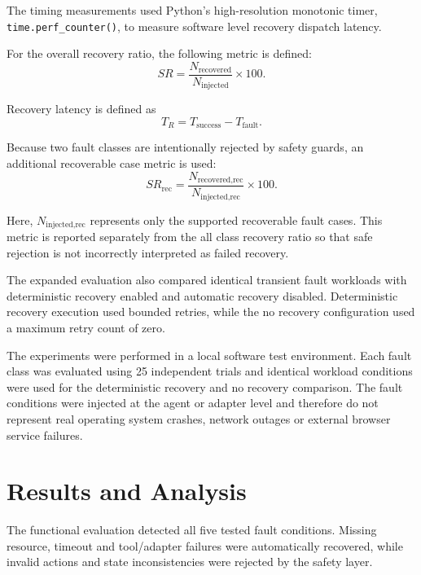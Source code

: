 \documentclass[conference]{IEEEtran}
\begin{document}
The timing measurements used Python's high-resolution monotonic timer, \texttt{time.perf\_counter()}, to measure software level recovery dispatch latency.

For the overall recovery ratio, the following metric is defined:
\begin{equation}
SR = \frac{N_{\text{recovered}}}{N_{\text{injected}}} \times 100.
\end{equation}

Recovery latency is defined as
\begin{equation}
T_R = T_{\text{success}} - T_{\text{fault}}.
\end{equation}

Because two fault classes are intentionally rejected by safety guards, an additional recoverable case metric is used:
\begin{equation}
SR_{\text{rec}} = \frac{N_{\text{recovered,rec}}}{N_{\text{injected,rec}}} \times 100.
\end{equation}

Here, $N_{\text{injected,rec}}$ represents only the supported recoverable fault cases. This metric is reported separately from the all class recovery ratio so that safe rejection is not incorrectly interpreted as failed recovery.

The expanded evaluation also compared identical transient fault workloads with deterministic recovery enabled and automatic recovery disabled. Deterministic recovery execution used bounded retries, while the no recovery configuration used a maximum retry count of zero.

The experiments were performed in a local software test environment. Each fault class was evaluated using 25 independent trials and identical workload conditions were used for the deterministic recovery and no recovery comparison. The fault conditions were injected at the agent or adapter level and therefore do not represent real operating system crashes, network outages or external browser service failures.

\section{Results and Analysis}
The functional evaluation detected all five tested fault conditions. Missing resource, timeout and tool/adapter failures were automatically recovered, while invalid actions and state inconsistencies were rejected by the safety layer.
\end{document}
